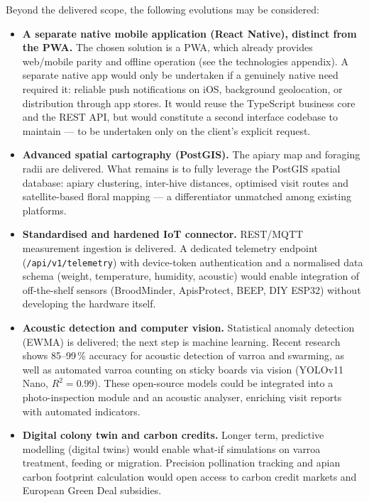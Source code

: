 Beyond the delivered scope, the following evolutions may be considered:
\begin{itemize}
  \item \textbf{A separate native mobile application (React Native), distinct from
  the PWA.} The chosen solution is a PWA, which already provides web/mobile parity
  and offline operation (see the technologies appendix). A separate native app
  would only be undertaken if a genuinely native need required it: reliable push
  notifications on iOS, background geolocation, or distribution through app stores.
  It would reuse the TypeScript business core and the REST API, but would
  constitute a second interface codebase to maintain --- to be undertaken only on
  the client's explicit request.

  \item \textbf{Advanced spatial cartography (PostGIS).}
  The apiary map and foraging radii are delivered. What remains is to fully leverage
  the PostGIS spatial database: apiary clustering, inter-hive distances, optimised
  visit routes and satellite-based floral mapping --- a differentiator unmatched
  among existing platforms.

  \item \textbf{Standardised and hardened IoT connector.}
  REST/MQTT measurement ingestion is delivered. A dedicated telemetry endpoint
  (\texttt{/api/v1/telemetry}) with device-token authentication and a normalised
  data schema (weight, temperature, humidity, acoustic) would enable integration of
  off-the-shelf sensors (BroodMinder, ApisProtect, BEEP, DIY ESP32) without
  developing the hardware itself.

  \item \textbf{Acoustic detection and computer vision.}
  Statistical anomaly detection (EWMA) is delivered; the next step is machine
  learning. Recent research shows 85--99\,\% accuracy for acoustic detection of
  varroa and swarming, as well as automated varroa counting on sticky boards via
  vision (YOLOv11 Nano, $R^2 = 0.99$). These open-source models could be integrated
  into a photo-inspection module and an acoustic analyser, enriching visit reports
  with automated indicators.

  \item \textbf{Digital colony twin and carbon credits.}
  Longer term, predictive modelling (digital twins) would enable what-if
  simulations on varroa treatment, feeding or migration. Precision pollination
  tracking and apian carbon footprint calculation would open access to carbon
  credit markets and European Green Deal subsidies.
\end{itemize}
